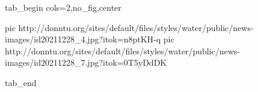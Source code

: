  
 
 
 
 

\ifcmt
  tab_begin cols=2,no_fig,center

     pic http://donntu.org/sites/default/files/styles/water/public/news-images/id20211228_4.jpg?itok=n8ptKH-q
		 pic http://donntu.org/sites/default/files/styles/water/public/news-images/id20211228_7.jpg?itok=0T5yDdDK

  tab_end
\fi
